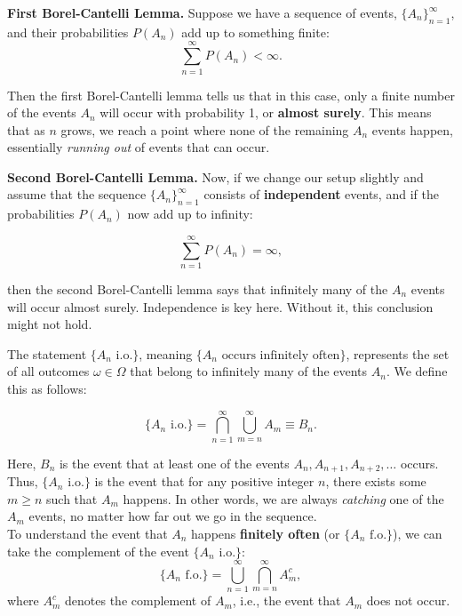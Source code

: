 \begin{lemma}
    \textbf{First Borel-Cantelli Lemma.} Suppose we have a sequence of events, \(\{A_n\}_{n=1}^{\infty}\), and their probabilities \(P(A_n)\) add up to something finite:
    \[
    \sum_{n=1}^{\infty} P(A_n) < \infty.
    \]

    Then the first Borel-Cantelli lemma tells us that in this case, only a finite number of the events \(A_n\) will occur with probability 1, or \textbf{almost surely}. This means that as \(n\) grows, we reach a point where none of the remaining \(A_n\) events happen, essentially \textit{running out} of events that can occur.
\end{lemma}

\begin{lemma}
    \textbf{Second Borel-Cantelli Lemma.} Now, if we change our setup slightly and assume that the sequence \(\{A_n\}_{n=1}^{\infty}\) consists of \textbf{independent} events, and if the probabilities \(P(A_n)\) now add up to infinity:

    \[
    \sum_{n=1}^{\infty} P(A_n) = \infty,
    \]
    
    then the second Borel-Cantelli lemma says that infinitely many of the \(A_n\) events will occur almost surely. Independence is key here. Without it, this conclusion might not hold.    
\end{lemma}

The statement \(\{A_n \text{ i.o.}\}\), meaning \(\{A_n \text{ occurs infinitely often}\}\), represents the set of all outcomes \(\omega \in \Omega\) that belong to infinitely many of the events \(A_n\). We define this as follows:

\[
\{A_n \text{ i.o.}\} = \bigcap_{n=1}^{\infty} \bigcup_{m=n}^{\infty} A_m \equiv B_n.
\]

Here, \(B_n\) is the event that at least one of the events \(A_n, A_{n+1}, A_{n+2}, \ldots\) occurs. Thus, \(\{A_n \text{ i.o.}\}\) is the event that for any positive integer \(n\), there exists some \(m \geq n\) such that \(A_m\) happens. In other words, we are always \textit{catching} one of the \(A_m\) events, no matter how far out we go in the sequence.\\

To understand the event that \(A_n\) happens \textbf{finitely often} (or \(\{A_n \text{ f.o.}\}\)), we can take the complement of the event \(\{A_n \text{ i.o.}\}\):
\[
\{A_n \text{ f.o.}\} = \bigcup_{n=1}^{\infty} \bigcap_{m=n}^{\infty} A_m^c,
\]
where \(A_m^c\) denotes the complement of \(A_m\), i.e., the event that \(A_m\) does not occur.\\

